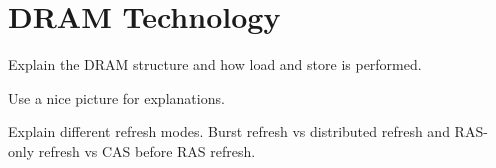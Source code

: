 \section{DRAM Technology} 
\label{sec:technology}

Explain the DRAM structure and how load and store is performed.

Use a nice picture for explanations.

Explain different refresh modes.
Burst refresh vs distributed refresh and RAS-only refresh vs CAS before RAS refresh.

